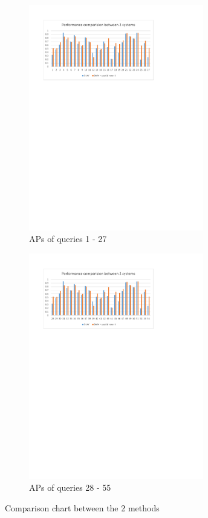 \begin{figure}
  
		\begin{subfigure}{.5\textwidth}
		\centering
    \includegraphics[width=3.0in]{ap1.pdf}
		\caption{APs of queries 1 - 27}
		\end{subfigure}
		
		\begin{subfigure}{.5\textwidth}
		\centering
		\includegraphics[width=3.0in]{ap2.pdf}
		\caption{APs of queries 28 - 55}
		\end{subfigure}
		
    \caption{Comparison chart between the 2 methods}
    \label{fig:ap_chart}
\end{figure}
